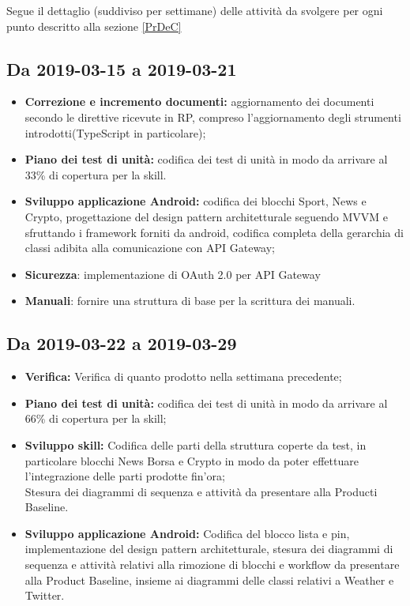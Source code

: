 \begin{flushleft}
Segue il dettaglio (suddiviso per settimane) delle attività da svolgere per ogni punto descritto alla sezione \ref{PrDeC}
\subsection{Da 2019-03-15 a 2019-03-21}
\begin{itemize}
	
	\item \textbf{Correzione e incremento documenti:} aggiornamento dei documenti secondo le direttive ricevute in RP, compreso l'aggiornamento degli strumenti introdotti(TypeScript in particolare);
	\item \textbf{Piano dei test di unità:} codifica dei test di unità in modo da arrivare al 33\% di copertura per la skill.
	\item \textbf{Sviluppo applicazione Android:} codifica dei blocchi Sport, News e Crypto, progettazione del design pattern architetturale seguendo MVVM e sfruttando i framework forniti da android, codifica completa della gerarchia di classi adibita alla comunicazione con API Gateway;
	\item \textbf{Sicurezza}: implementazione di OAuth 2.0 per API Gateway
	\item \textbf{Manuali}: fornire una struttura di base per la scrittura dei manuali.
	
\end{itemize}


\subsection{Da 2019-03-22 a 2019-03-29}\label{DCprimaSett}
\begin{itemize}
	\item \textbf{Verifica:} Verifica di quanto prodotto nella settimana precedente;
	\item \textbf{Piano dei test di unità:} codifica dei test di unità in modo da arrivare al 66\% di copertura per la skill;
	\item \textbf{Sviluppo skill:} Codifica delle parti della struttura coperte da test, in particolare blocchi News Borsa e Crypto in modo da poter effettuare l'integrazione delle parti prodotte fin'ora;\\
	Stesura dei diagrammi di sequenza e attività da presentare alla Producti Baseline.\\
	\item \textbf{Sviluppo applicazione Android:} Codifica del blocco lista e pin, implementazione del design pattern architetturale, stesura dei diagrammi di sequenza e attività relativi alla rimozione di blocchi e workflow da presentare alla Product Baseline, insieme ai diagrammi delle classi relativi a Weather e Twitter.
\end{itemize}



\end{flushleft}
